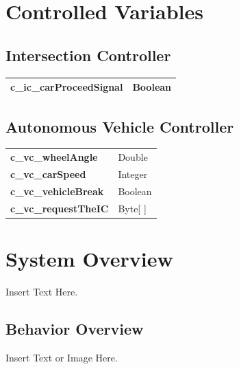 \documentclass [11pt]{article}
\begin{document}





\section{Controlled Variables}


\subsection{Intersection Controller}

\begin{longtable}{ |p{ }  p{ }|}  \hline

\textbf{c\_ic\_carProceedSignal} & Boolean \\ \hline
\end{longtable}

\subsection{Autonomous Vehicle Controller}

\begin{longtable}{ |p{ }  p{ }|}  \hline
\textbf{c\_vc\_wheelAngle} & Double  \\

\cellcolor{tableCell}\textbf{c\_vc\_carSpeed}  & \cellcolor{tableCell}Integer \\ 

\textbf{c\_vc\_vehicleBreak} & Boolean \\ 

\cellcolor{tableCell}\textbf{c\_vc\_requestTheIC}  & \cellcolor{tableCell}Byte[ ]\\ \hline
\end{longtable}



\section{System Overview}
Insert Text Here. 

\subsection{Behavior Overview}
Insert Text or Image Here. 
\end{document}
